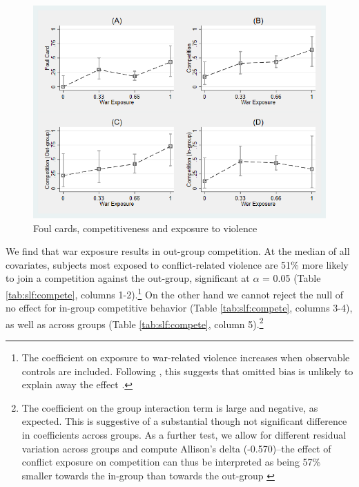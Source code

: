 \begin{figure}[htb]
  \includegraphics[width=0.8\linewidth]{"chapters/slfootball/figures/f4_we_competition.png"}
  \caption{Foul cards, competitiveness and exposure to violence}
  \label{fig:slf:we_competition}
\end{figure}

We find that war exposure results in out-group competition. At the median of all covariates, subjects most exposed to conflict-related violence are 51\% more likely to join a competition against the out-group, significant at $\alpha$ = 0.05 (Table \ref{tab:slf:compete}, columns 1-2).\footnote{The coefficient on exposure to war-related violence increases when observable controls are included. Following \citet{Bellows2009b}, this suggests that omitted bias is unlikely to explain away the effect \citep[see also][]{Altonji2005}.} On the other hand we cannot reject the null of no effect for in-group competitive behavior (Table \ref{tab:slf:compete}, columns 3-4), as well as across groups (Table \ref{tab:slf:compete}, column 5).\footnote{The coefficient on the group interaction term is large and negative, as expected. This is suggestive of a substantial though not significant difference in coefficients across groups. As a further test, we allow for different residual variation across groups and compute Allison’s delta (-0.570)--the effect of conflict exposure on competition can thus be interpreted as being 57\% smaller towards the in-group than towards the out-group \citep{Allison1999a}}

